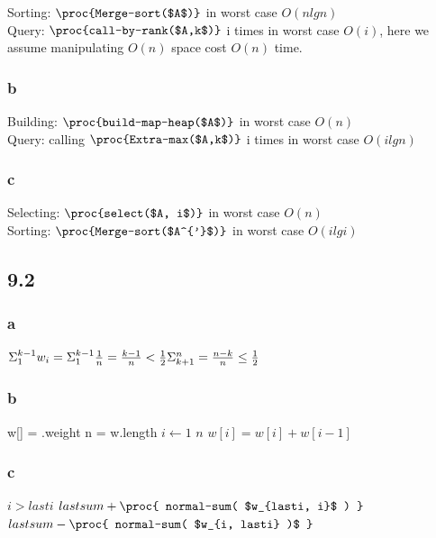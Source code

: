 \documentclass[]{article}
\begin{document}
Sorting: $\proc{Merge-sort($A$)}$ in worst case $O(nlgn)$\\
Query: $\proc{call-by-rank($A,k$)}$ i times in worst case $O(i)$, here we assume manipulating $O(n)$ space cost $O(n)$ time.

\subsubsection{b}

Building: $\proc{build-map-heap($A$)}$ in worst case $O(n)$\\
Query: calling $\proc{Extra-max($A,k$)}$ i times in worst case $O(ilgn)$

\subsubsection{c}

Selecting: $\proc{select($A, i$)}$ in worst case $O(n)$\\
Sorting:  $\proc{Merge-sort($A^{'}$)}$ in worst case $O(ilgi)$

\subsection{9.2}
\subsubsection{a}

$\Sigma_{1}^{k-1} w_{i} = \Sigma_{1}^{k-1} \frac{1}{n} = \frac{k-1}{n} < \frac{1}{2}\\
\Sigma_{k+1}^{n} = \frac{n-k}{n} \le \frac{1}{2}$

\subsubsection{b}

\begin{codebox}
	\li w[] = .weight
	\li n = w.length
	\li	\For $i \gets 1$ \To $n$
	\li 	\Do $w[i] = w[i] + w[i-1]$
	\End
	\li \Return {}
\end{codebox}

\subsubsection{c}

\begin{codebox}
	\li \If $i>lasti$
	\li  \Then \Return $lastsum + \proc{ normal-sum( $w_{lasti, i}$ ) }$
	\li  \Else \Return $lastsum - \proc{ normal-sum( $w_{i, lasti} )$ }$ 
	\End
\end{codebox}
\end{document}
